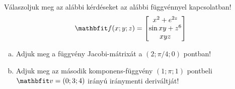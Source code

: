 \begin{exercise}{%
    Válaszoljuk meg az alábbi kérdéseket az alábbi függvénnyel kapcsolatban!
  }
  \[
    \rvec f(x;y;z) = \begin{bmatrix}
      x^2 + e^{2z}  \\
      \sin xy + z^6 \\
      xyz
    \end{bmatrix}
  \]
  \begin{enumerate}[a)]
    \item Adjuk meg a függvény Jacobi-mátrixát a $(2; \pi/4; 0)$ pontban!
    \item Adjuk meg az második komponens-függvény $(1; \pi; 1)$ pontbeli
          $\rvec v = (0; 3; 4)$ irányú iránymenti deriváltját!
  \end{enumerate}

\end{exercise}
